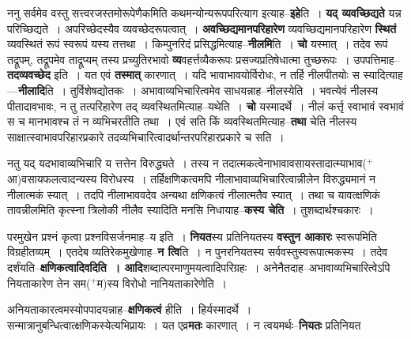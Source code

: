 \documentclass[article,12pt,a4paper]{memoir}
\newcommand{\add}[1]{($^{+}$#1)}
\begin{document}
	  \pstart ननु सर्वमेव वस्तु सत्त्वरजस्तमोरूपेणैकमिति कथमन्योन्यरूपपरित्याग इत्याह--\textbf{इहे}ति । \textbf{यद् व्यवच्छिद्यते} यन्न परिच्छिद्यते । अपरिच्छेदस्यैव व्यवच्छेदरूपत्वात् । \textbf{अवच्छिद्यमानपरिहारेण} व्यवच्छिद्यमानपरिहारेण \textbf{स्थितं} व्यवस्थितं रूपं स्वरूपं यस्य तत्तथा । किम्पुनरिदं प्रसिद्धमित्याह--\textbf{नीलमि}ति । \textbf{चो} यस्मात् । तदेव रूपं तद्रूपम्, तद्रूपमेव ताद्रूप्यम् तस्य प्रच्युतिरभावो \textbf{व्य}वहर्त्तव्यैकरूपः प्रसज्यप्रतिषेधात्मा तुच्छरूपः । उपपत्तिमाह--\textbf{तदव्यवच्छेद} इति । यत एवं \textbf{तस्मात्} कारणात् । यदि भावाभावयोर्विरोधः, न तर्हि नीलपीतयोः स स्यादित्याह—\textbf{नीलादि}ति । तुर्विशेषद्योतकः । अभावाव्यभिचारित्वमेव साधयन्नाह--नीलस्येति । भवत्येवं नीलस्य पीतादावभावः, न तु तत्परिहारेण तद् व्यवस्थितमित्याह--यथेति । \textbf{चो} यस्मादर्थे । नीलं कर्त्तृ स्वाभावं स्वभावं  स च मानभावश्च  तं न व्यभिचरतीति तथा । एवं सति किं व्यवस्थितमित्याह--\textbf{तथा} चेति नीलस्य साक्षात्स्वाभावपरिहारप्रकारे तदव्यभिचारित्वादर्थान्तरपरिहारप्रकारे च सति ।
	\pend
      

	  \pstart नतु  यद् यदभावाव्यभिचारि य  त्तत्तेन विरुद्ध्यते । तस्य न तदात्मकत्वेनाभावावसायस्तादात्म्याभाव\add{आ}वसायफलत्वादन्यस्य विरोधस्य । तर्हिक्षणिकत्वमपि नीलाभावाव्यभिचारित्वान्नीलेन विरुद्ध्यमानं न नीलात्मकं स्यात् । तदपि नीलाभाववदेव अन्यथा क्षणिकत्वं नीलात्मतैव स्यात् । तथा च यावत्क्षणिकं तावन्नीलमिति कृत्स्ना त्रिलोकी नीलैव स्यादिति मनसि निधायाह--\textbf{कस्य चेति} । तुशब्दार्थश्चकारः ।
	\pend
      

	  \pstart परमु\leavevmode{}खेन प्रश्नं कृत्वा प्रश्नविसर्जनमाह--य इति । \textbf{नियत}स्य प्रतिनियतस्य \textbf{वस्तुन आकारः} स्वरूपमिति विग्रहीतव्यम् । एतदेब व्यतिरेकमुखेणाह--\textbf{न त्वि}ति । न पुनरनियतस्य सर्ववस्तुस्वरूपात्मकस्य । तदेव दर्शंयति--\textbf{क्षणिकत्वादिवदिति । आदि}शब्दात्परमाणुमयत्वादिपरिग्रहः । अनेनैतदाह--अभावाव्यभिचारित्वेऽपि नियताकारेण तेन सम\add{म}स्य विरोधो नानियताकारेणेति ।
	\pend
      

	  \pstart अनियताकारत्वमस्योपपादयन्नाह--\textbf{क्षणिकत्वं} हीति । हिर्यस्मादर्थे । सन्मात्रानुबन्धित्वात्क्षणिकस्येत्यभिप्रायः । यत एव्र\textbf{मतः} कारणात् । न त्वयमर्थः--\textbf{नियतः} प्रतिनियत  \leavevmode{} 
	  
\end{document}
